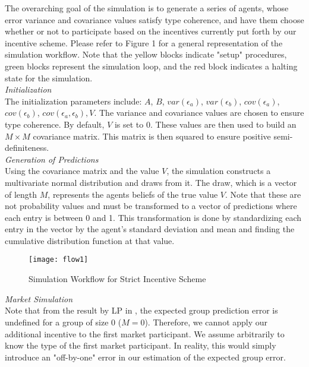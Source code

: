 \documentclass[twoside,twocolumn]{article}
\begin{document}
The overarching goal of the simulation is to generate a series of agents, whose error variance and covariance values satisfy type coherence, and have them choose whether or not to participate based on the incentives currently put forth by our incentive scheme. Please refer to Figure 1 for a general representation of the simulation workflow. Note that the yellow blocks indicate "setup" procedures, green blocks represent the simulation loop, and the red block indicates a halting state for the simulation.\\

\textit{Initialization}\\

The initialization parameters include: $A$, $B$, $var(\epsilon_a)$, $var(\epsilon_b)$, $cov(\epsilon_a)$, $cov(\epsilon_b)$, $cov(\epsilon_a, \epsilon_b), V$. The variance and covariance values are chosen to ensure type coherence. By default, $V$ is set to 0. These values are then used to build an $M \times M$ covariance matrix. This matrix is then squared to ensure positive semi-definiteness.\\

\textit{Generation of Predictions}\\

Using the covariance matrix and the value $V$, the simulation constructs a multivariate normal distribution and draws from it. The draw, which is a vector of length $M$, represents the agents beliefs of the true value $V$. Note that these are not probability values and must be transformed to a vector of predictions where each entry is between 0 and 1. This transformation is done by standardizing each entry in the vector by the agent's standard deviation and mean and finding the cumulative distribution function at that value.\\

\begin{figure}[h]
\centering
\texttt{[image: flow1]}
\caption{Simulation Workflow for Strict Incentive Scheme}
\end{figure}



\textit{Market Simulation}\\

Note that from the result by LP in \cite{3}, the expected group prediction error is undefined for a group of size 0 ($M = 0$). Therefore, we cannot apply our additional incentive to the first market participant. We assume arbitrarily to know the type of the first market participant. In reality, this would simply introduce an "off-by-one" error in our estimation of the expected group error.\\
\end{document}
